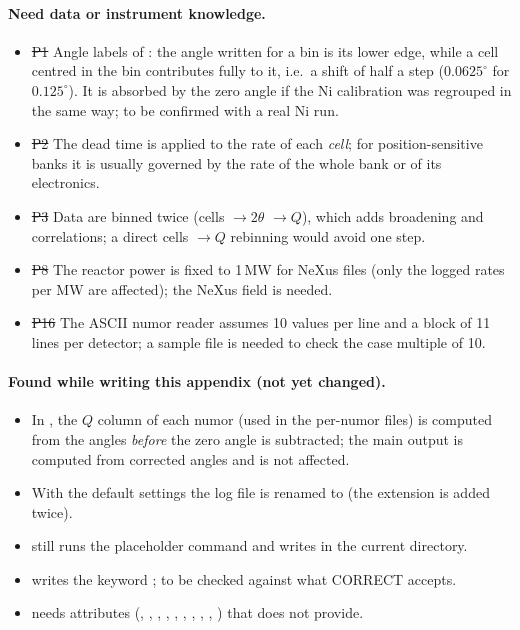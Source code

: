 \documentclass[11pt,a4paper]{article}
\begin{document}
\label{sec:open}

\paragraph{Need data or instrument knowledge.}
\begin{itemize}
  \item \st{P1} Angle labels of : the angle written for a bin
    is its lower edge, while a cell centred in the bin contributes fully to
    it, i.e.\ a shift of half a step ($0.0625^\circ$ for $0.125^\circ$). It
    is absorbed by the zero angle if the Ni calibration was regrouped in the
    same way; to be confirmed with a real Ni run.
  \item \st{P2} The dead time is applied to the rate of each \emph{cell};
    for position-sensitive banks it is usually governed by the rate of the
    whole bank or of its electronics.
  \item \st{P3} Data are binned twice (cells $\to 2\theta$ $\to Q$), which
    adds broadening and correlations; a direct cells $\to Q$ rebinning
    would avoid one step.
  \item \st{P8} The reactor power is fixed to 1\,MW for NeXus files (only
    the logged rates per MW are affected); the NeXus field is needed.
  \item \st{P16} The ASCII numor reader assumes 10 values per line and a
    block of 11 lines per detector; a sample file is needed to check the
    case  multiple of 10.
\end{itemize}

\paragraph{Found while writing this appendix (not yet changed).}
\begin{itemize}
  \item In , the $Q$ column of each numor (used in the
    per-numor  files) is computed from the angles \emph{before}
    the zero angle is subtracted; the main  output is computed
    from corrected angles and is not affected.
  \item With the default settings the log file is renamed to
     (the extension is added twice).
  \item {} still runs the placeholder command
     and writes  in the current
    directory.
  \item {} writes the keyword ; to be
    checked against what CORRECT accepts.
  \item \sloppy {} needs attributes (,
    , , ,
    , , ,
    , , ) that
     does not provide.
\end{itemize}
\end{document}
